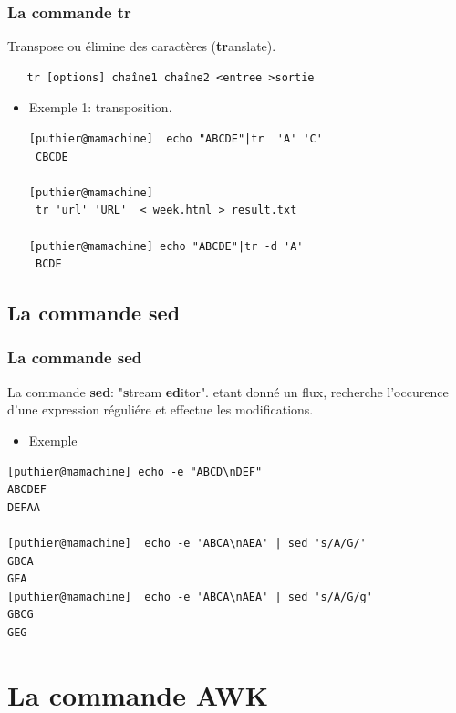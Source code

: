 \documentclass[10pt, xcolor=dvipsnames]{beamer}
\begin{document}
\begin{frame}[fragile]

\frametitle{La commande tr}

Transpose ou élimine des caractères (\textbf{tr}anslate).
            \begin{verbatim}
   tr [options] chaîne1 chaîne2 <entree >sortie
             \end{verbatim}

    \begin{itemize}
    \item Exemple 1: transposition.
             \begin{verbatim}
[puthier@mamachine]  echo "ABCDE"|tr  'A' 'C'
 CBCDE

[puthier@mamachine]
 tr 'url' 'URL'  < week.html > result.txt

[puthier@mamachine] echo "ABCDE"|tr -d 'A'
 BCDE
             \end{verbatim}
    \end{itemize}

\end{frame}

 \subsection{La commande sed}

\begin{frame}[fragile]
 \frametitle{La commande sed}
  La commande \textbf{sed}: "\textbf{s}tream \textbf{ed}itor". etant donné un flux, recherche l'occurence d'une expression réguliére et effectue les modifications. 

    \begin{itemize}
    \item Exemple 
\end{itemize}

             \begin{verbatim}
[puthier@mamachine] echo -e "ABCD\nDEF"
ABCDEF
DEFAA

[puthier@mamachine]  echo -e 'ABCA\nAEA' | sed 's/A/G/'
GBCA
GEA
[puthier@mamachine]  echo -e 'ABCA\nAEA' | sed 's/A/G/g'
GBCG
GEG
             \end{verbatim}
\end{frame}


\section{La commande AWK}
\end{document}
